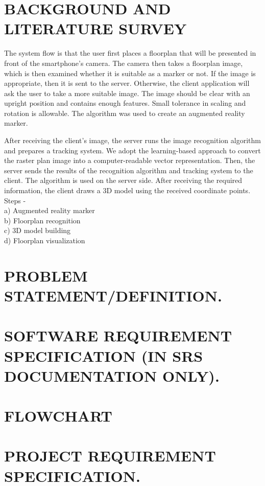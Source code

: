 \documentclass[12pt]{article}
\begin{document}
\section{\uppercase{\large{Background and Literature Survey}}}
The system flow is that the user first places a floorplan that will be presented in front of the smartphone’s camera. The camera then takes a floorplan image, which is then examined whether it is suitable as a marker or not. If the image is appropriate, then it is sent to the server. Otherwise, the client application will ask the user to take a more suitable image. The image should be clear with an upright position and contains enough features. Small tolerance in scaling and rotation is allowable. The algorithm was used to create an augmented reality marker.

After receiving the client’s image, the server runs the image recognition algorithm and prepares a tracking system. We adopt the learning-based approach to convert the raster plan image into a computer-readable vector representation. Then, the server sends the results of the recognition algorithm and tracking system to the client. The algorithm is used on the server side. After receiving the required information, the client draws a 3D model using the received coordinate points.\\
Steps - \\
a) Augmented reality marker\\
b) Floorplan recognition\\
c) 3D model building\\
d) Floorplan visualization\\

\section{\uppercase{\large{Problem Statement/Definition.}}}

\section{\uppercase{\large{Software Requirement Specification (In SRS Documentation only).}}}

\section{\uppercase{\large{Flowchart}}}

\section{\uppercase{\large{Project Requirement specification.}}}
\end{document}
